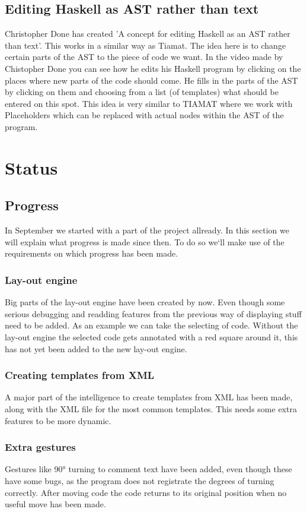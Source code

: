 \documentclass[a4paper,12pt]{report}
\begin{document}
\section{Editing Haskell as AST rather than text}
Christopher Done has created 'A concept for editing Haskell as an AST rather than text'. This works in a similar way as Tiamat. The idea here is to change certain parts of the AST to the piece of 
code we want. In the video made by Chistopher Done you can see how he edits his Haskell program by clicking on the places where new parts of the code should come. He fills in the parts of the AST
by clicking on them and choosing from a list (of templates) what should be entered on this spot.
This idea is very similar to TIAMAT where we work with Placeholders which can be replaced with actual nodes within the AST of the program.
\chapter{Status}
\section{Progress}
In September we started with a part of the project allready. In this section we will explain what progress is made since then. To do so we`ll make use of the requirements on which progress has been made.
\subsection{Lay-out engine}
Big parts of the lay-out engine have been created by now. Even though some serious debugging and readding features from the previous way of displaying stuff need to be added. As an example we can take
the selecting of code. Without the lay-out engine the selected code gets annotated with a red square around it, this has not yet been added to the new lay-out engine.
\subsection{Creating templates from XML}
A major part of the intelligence to create templates from XML has been made, along with the XML file for the most common templates. This needs some extra features to be more dynamic.
\subsection{Extra gestures}
Gestures like 90° turning to comment text have been added, even though these have some bugs, as the program does not registrate the degrees of turning correctly.
After moving code the code returns to its original position when no useful move has been made.
\end{document}
